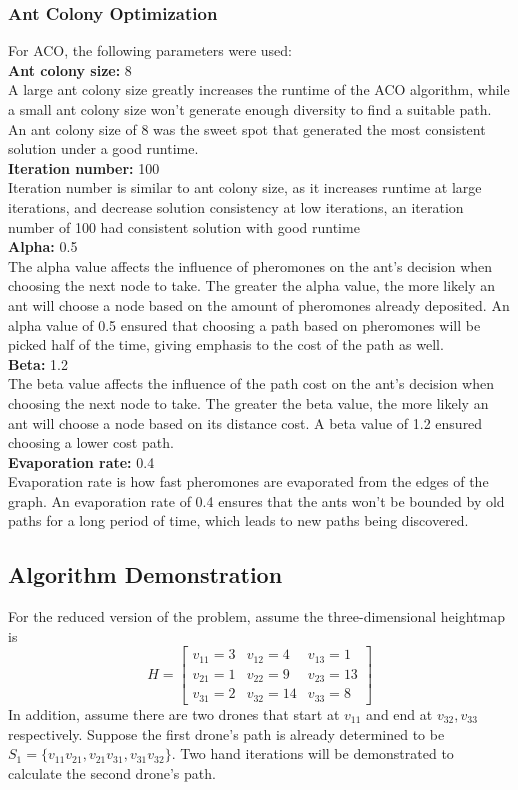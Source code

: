 \documentclass[conference]{IEEEtran}
\begin{document}
\subsubsection{Ant Colony Optimization}
For ACO, the following parameters were used:\\
\textbf{Ant colony size: } 8 \\
A large ant colony size greatly increases the runtime of the ACO algorithm, while a small ant colony size won't generate enough diversity to find a suitable path. An ant colony size of 8 was the sweet spot that generated the most consistent solution under a good runtime.\\
\textbf{Iteration number: } 100 \\
Iteration number is similar to ant colony size, as it increases runtime at large iterations, and decrease solution consistency at low iterations, an iteration number of 100 had consistent solution with good runtime \\
\textbf{Alpha: } 0.5 \\
The alpha value affects the influence of pheromones on the ant's decision when choosing the next node to take. The greater the alpha value, the more likely an ant will choose a node based on the amount of pheromones already deposited. An alpha value of 0.5 ensured that choosing a path based on pheromones will be picked half of the time, giving emphasis to the cost of the path as well.\\
\textbf{Beta: } 1.2 \\
The beta value affects the influence of the path cost on the ant's decision when choosing the next node to take. The greater the beta value, the more likely an ant will choose a node based on its distance cost. A beta value of 1.2 ensured choosing a lower cost path. \\
\textbf{Evaporation rate: } 0.4 \\
Evaporation rate is how fast pheromones are evaporated from the edges of the graph. An evaporation rate of 0.4 ensures that the ants won't be bounded by old paths for a long period of time, which leads to new paths being discovered.

\subsection{Algorithm Demonstration}
For the reduced version of the problem, assume the three-dimensional heightmap is 
$$H =
\begin{bmatrix}
    v_{11}=3 & v_{12}=4 & v_{13}=1 \\
    v_{21}=1 & v_{22}=9 & v_{23}=13 \\
    v_{31}=2 & v_{32}=14 & v_{33}=8
\end{bmatrix}
$$
In addition, assume there are two drones that start at $v_{11}$ and end at $v_{32}, v_{33}$ respectively. Suppose the first drone's path is already determined to be $S_1 = \{ v_{11}v_{21}, v_{21}v_{31}, v_{31}v_{32} \}$. Two hand iterations will be demonstrated to calculate the second drone's path.
\end{document}
